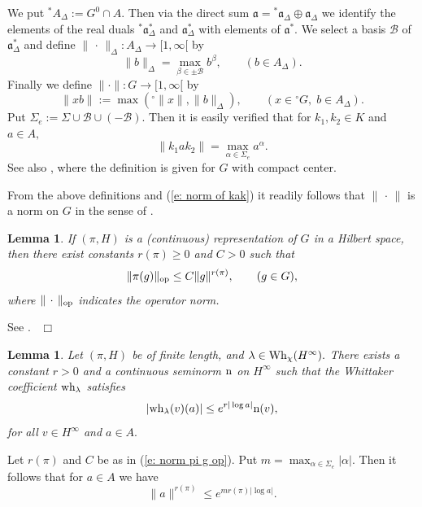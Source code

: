 \documentclass[12pt,a4paper]{article}
\newtheorem{Lemma}[Thm]{Lemma}
\newenvironment{lemma}[0]{\begin{Lemma}\noindent}%
{\end{Lemma}}
\def\proof{\par\noindent{\it Proof.}{\ }{\ }}
\def\qed{~\hfill\hbox{$\Box$}\medbreak}
\def\qquad{\quad\quad}
\def\ga{\alpha}
\def\gb{\beta}
\def\gl{\lambda}
\def\gD{\Delta}
\def\gS{\Sigma}
\def\got#1{\mathfrak #1}
\def\fa{{\got a}}
\def\to{\rightarrow}
\def\cB{{\mathcal B}}
\numberwithin{Thm}{section}
\numberwithin{equation}{section}
\def\dotvar{\, \cdot\,}
\def\Wh{{\rm Wh}}
\numberwithin{equation}{section}
\def\wh{{\rm wh}}
\def\cchi{\chi}
\begin{document}
We put ${}^*A_\gD := G^0\cap A.$ Then via the direct sum $\fa = {}^*\fa_\gD \oplus \fa_\gD$ 
we identify the elements of the real duals ${}^*\fa_\gD^*$ and $\fa_\gD^*$  with elements of $\fa^*.$ 
We select a basis $\cB$ of $\fa_\gD^*$ and define $\|\dotvar \|_\gD: A_\gD \to [1, \infty[$ 
by  
$$ 
\|b\|_\gD = \max_{\beta \in \pm \cB}  b^{\gb}, \qquad (b \in A_\gD).
$$ 
Finally we define $\|\cdot \|: G \to [1,\infty[$ by 
$$ 
\| x b\|  := \max( {}^\circ \|x\|, \|b\|_\gD),\qquad (x \in {}^\circ G , \; b \in A_\gD).
$$ 
Put $\gS_e:= \gS \cup \cB \cup (-\cB).$ Then it is easily verified that for $k_1, k_2 \in K$ and $a \in A,$ 
\begin{equation}
\label{e: norm of kak}
\|k_1 a k_2\| = \max_{\ga \in \Sigma_e} a^\ga.
\end{equation}
See also \cite[Lemma 2.1]{BSbv}, where the definition is given for $G$ with compact center. 

From the above definitions and (\ref{e: norm of kak}) it readily follows that  $\|\dotvar \|$ is a norm on $G$ in the sense 
of \cite[Lemma 2.A.2.1]{Wrrg1}.
 
\begin{lemma}
If $(\pi, H)$ is a (continuous) representation of $G$
in a Hilbert space, then there exist constants $r(\pi)  \geq 0$ and $C > 0$ 
such that
\begin{equation}
\label{e: norm pi g op}
\|\pi(g)\|_{\rm op} \leq  C \|g\|^{r(\pi)}, \qquad (g \in G),
\end{equation} 
where $\|\dotvar\|_{\rm op}$ indicates the operator norm. 
\end{lemma}
 \proof See \cite[Lemma 2.A.2.2]{Wrrg1}.
\qed

\begin{lemma}
Let $(\pi, H)$ be of finite length, and $\gl \in \Wh_\cchi(H^\infty).$ There exists
a constant $r > 0$ and a continuous seminorm ${\rm n}$ on $H^\infty$ 
such that the Whittaker coefficient $\wh_\gl$ satisfies 
\begin{equation}
\label{e: first estimate Whittaker coeff}
|\wh_\gl(v)(a)|\leq e^{r|\log a|} {\rm n}(v),
\end{equation} 
for all $v \in H^\infty $ and $a \in A.$ 
\end{lemma}

\proof 
Let $r(\pi)$ and $C$ be as in (\ref{e: norm pi g op}). Put $m = \max_{\ga \in \gS_e} |\ga|.$
Then it follows that for $a \in A$ we have
$$ 
\|a\|^{r(\pi)}  \leq e^{m r(\pi)| \log a|}.
$$ 
\end{document}

